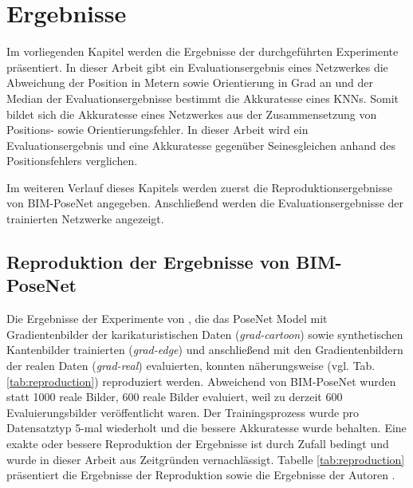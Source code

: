 
\section{Ergebnisse}
Im vorliegenden Kapitel werden die Ergebnisse der durchgeführten Experimente präsentiert. In dieser Arbeit gibt ein Evaluationsergebnis eines Netzwerkes die Abweichung der Position in Metern sowie Orientierung in Grad an und der Median der Evaluationsergebnisse bestimmt die Akkuratesse eines KNNs. Somit bildet sich die Akkuratesse eines Netzwerkes aus der Zusammensetzung von Positions- sowie Orientierungsfehler. In dieser Arbeit wird ein Evaluationsergebnis und eine Akkuratesse gegenüber Seinesgleichen anhand des Positionsfehlers verglichen.

Im weiteren Verlauf dieses Kapitels werden zuerst die Reproduktionsergebnisse von BIM-PoseNet \cite{acharyaBIMPoseNetIndoorCamera2019} angegeben. Anschließend werden die Evaluationsergebnisse der trainierten Netzwerke angezeigt.

\subsection{Reproduktion der Ergebnisse von BIM-PoseNet}
Die Ergebnisse der Experimente von \citet{acharyaBIMPoseNetIndoorCamera2019}, die das PoseNet Model mit Gradientenbilder der karikaturistischen Daten (\textit{grad-cartoon}) sowie synthetischen Kantenbilder trainierten (\textit{grad-edge}) und anschließend mit den Gradientenbildern der realen Daten (\textit{grad-real}) evaluierten, konnten näherungsweise (vgl. Tab. \ref{tab:reproduction}) reproduziert werden. Abweichend von BIM-PoseNet wurden statt 1000 reale Bilder, 600 reale Bilder evaluiert, weil zu derzeit 600 Evaluierungsbilder veröffentlicht waren. Der Trainingsprozess wurde pro Datensatztyp 5-mal wiederholt und die bessere Akkuratesse wurde behalten. Eine exakte oder bessere Reproduktion der Ergebnisse ist durch Zufall bedingt und wurde in dieser Arbeit aus Zeitgründen vernachlässigt. Tabelle \ref{tab:reproduction} präsentiert die Ergebnisse der Reproduktion sowie die Ergebnisse der Autoren \citet{acharyaBIMPoseNetIndoorCamera2019}.


